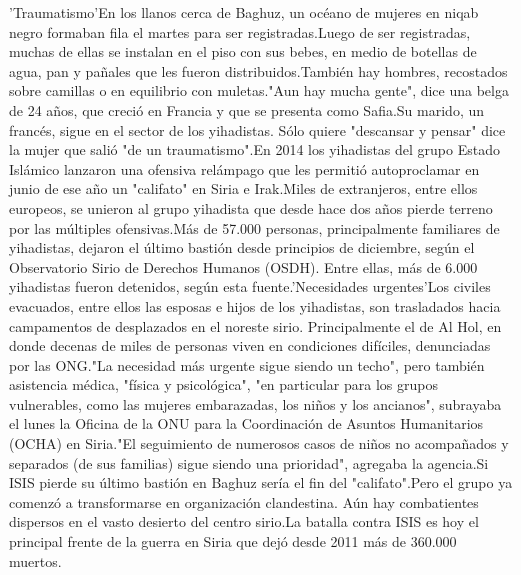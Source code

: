 \documentclass{article}%
\begin{document}
'Traumatismo'En los llanos cerca de Baghuz, un océano de mujeres en niqab negro formaban fila el martes para ser registradas.Luego de ser registradas, muchas de ellas se instalan en el piso con sus bebes, en medio de botellas de agua, pan y pañales que les fueron distribuidos.También hay hombres, recostados sobre camillas o en equilibrio con muletas."Aun hay mucha gente", dice una belga de 24 años, que creció en Francia y que se presenta como Safia.Su marido, un francés, sigue en el sector de los yihadistas. Sólo quiere "descansar y pensar" dice la mujer que salió "de un traumatismo".En 2014 los yihadistas del grupo Estado Islámico lanzaron una ofensiva relámpago que les permitió autoproclamar en junio de ese año un "califato" en Siria e Irak.Miles de extranjeros, entre ellos europeos, se unieron al grupo yihadista que desde hace dos años pierde terreno por las múltiples ofensivas.Más de 57.000 personas, principalmente familiares de yihadistas, dejaron el último bastión desde principios de diciembre, según el Observatorio Sirio de Derechos Humanos (OSDH). Entre ellas, más de 6.000 yihadistas fueron detenidos, según esta fuente.'Necesidades urgentes'Los civiles evacuados, entre ellos las esposas e hijos de los yihadistas, son trasladados hacia campamentos de desplazados en el noreste sirio. Principalmente el de Al Hol, en donde decenas de miles de personas viven en condiciones difíciles, denunciadas por las ONG."La necesidad más urgente sigue siendo un techo", pero también asistencia médica, "física y psicológica", "en particular para los grupos vulnerables, como las mujeres embarazadas, los niños y los ancianos", subrayaba el lunes la Oficina de la ONU para la Coordinación de Asuntos Humanitarios (OCHA) en Siria."El seguimiento de numerosos casos de niños no acompañados y separados (de sus familias) sigue siendo una prioridad", agregaba la agencia.Si ISIS pierde su último bastión en Baghuz sería el fin del "califato".Pero el grupo ya comenzó a transformarse en organización clandestina. Aún hay combatientes dispersos en el vasto desierto del centro sirio.La batalla contra ISIS es hoy el principal frente de la guerra en Siria que dejó desde 2011 más de 360.000 muertos.%
\newline%
%
\end{document}
